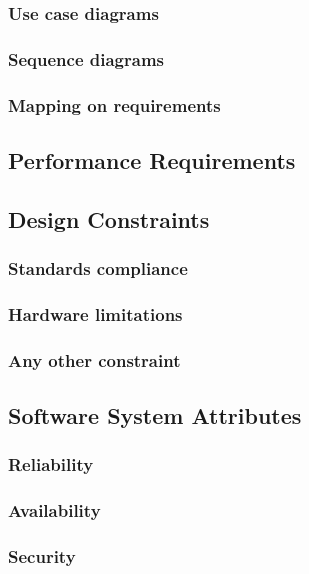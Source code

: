 \documentclass[11pt]{article}
\begin{document}
\subsubsection{Use case diagrams}

\subsubsection{Sequence diagrams}

\subsubsection{Mapping on requirements}

\subsection{Performance Requirements}

\subsection{Design Constraints}

\subsubsection{Standards compliance}

\subsubsection{Hardware limitations}

\subsubsection{Any other constraint}

\subsection{Software System Attributes}

\subsubsection{Reliability}

\subsubsection{Availability}

\subsubsection{Security}
\end{document}
